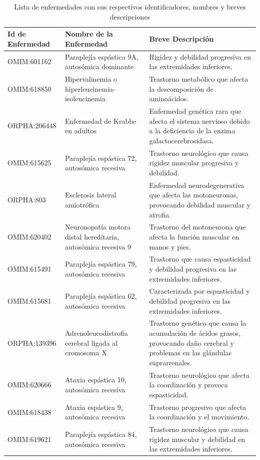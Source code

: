 \begin{table}[h!]
	\centering
	\begin{tabular}{|>{\centering\arraybackslash}m{2cm}|>{\centering\arraybackslash}m{3.7cm}|>{\centering\arraybackslash}m{5.5cm}|}
		\hline
		\textbf{Id de Enfermedad} & \textbf{Nombre de la Enfermedad} & \textbf{Breve Descripción} \\ \hline
		OMIM:601162 & Paraplejía espástica 9A, autosómica dominante & Rigidez y debilidad progresiva en las extremidades inferiores. \\ \hline
		OMIM:618850 & Hipervalinemia o hiperleucinemia-isoleucinemia & Trastorno metabólico que afecta la descomposición de aminoácidos. \\ \hline
		ORPHA:206448 & Enfermedad de Krabbe en adultos & Enfermedad genética rara que afecta el sistema nervioso debido a la deficiencia de la enzima galactocerebrosidasa. \\ \hline
		OMIM:615625 & Paraplejía espástica 72, autosómica recesiva & Trastorno neurológico que causa rigidez muscular progresiva y debilidad. \\ \hline
		ORPHA:803 & Esclerosis lateral amiotrófica & Enfermedad neurodegenerativa que afecta las motoneuronas, provocando debilidad muscular y atrofia. \\ \hline
		OMIM:620402 & Neuronopatía motora distal hereditaria, autosómica recesiva 9 & Trastorno del motoneurona que afecta la función muscular en manos y pies. \\ \hline
		OMIM:615491 & Paraplejía espástica 79, autosómica recesiva & Trastorno que causa espasticidad y debilidad progresiva en las extremidades inferiores. \\ \hline
		OMIM:615681 & Paraplejía espástica 62, autosómica recesiva & Caracterizada por espasticidad y debilidad progresiva en las extremidades inferiores. \\ \hline
		ORPHA:139396 & Adrenoleucodistrofia cerebral ligada al cromosoma X & Trastorno genético que causa la acumulación de ácidos grasos, provocando daño cerebral y problemas en las glándulas suprarrenales. \\ \hline
		OMIM:620666 & Ataxia espástica 10, autosómica recesiva & Trastorno neurológico que afecta la coordinación y provoca espasticidad. \\ \hline
		OMIM:618438 & Ataxia espástica 9, autosómica recesiva & Trastorno progresivo que afecta la coordinación y el movimiento. \\ \hline
		OMIM:619621 & Paraplejía espástica 84, autosómica recesiva & Trastorno neurológico que causa rigidez muscular y debilidad en las extremidades inferiores. \\ \hline
	\end{tabular}
	\caption{Lista de enfermedades con sus respectivos identificadores, nombres y breves descripciones}
	\label{tab:disease_list_desc}
\end{table}

